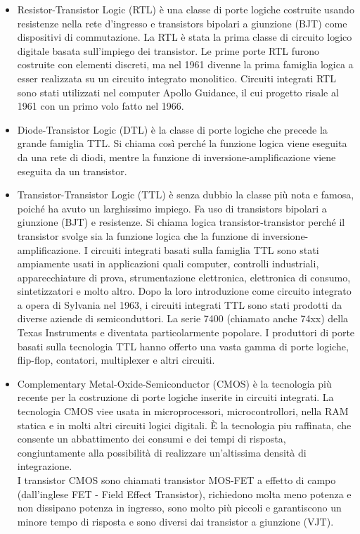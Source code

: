 \documentclass[a4paper]{extarticle}
\begin{document}
\begin{itemize}
    \item Resistor-Transistor Logic (RTL) è una classe di porte logiche costruite usando resistenze nella rete d’ingresso e transistors bipolari a giunzione (BJT) come dispositivi di commutazione. La RTL è stata la prima classe di circuito logico digitale basata sull’impiego dei transistor. Le prime porte RTL furono costruite con elementi discreti, ma nel 1961 divenne la prima famiglia logica a esser realizzata su un circuito integrato monolitico. Circuiti integrati RTL sono stati utilizzati nel computer Apollo Guidance, il cui progetto risale al 1961 con un primo volo fatto nel 1966.

    \item Diode-Transistor Logic (DTL) è la classe di porte logiche che precede la grande famiglia TTL. Si chiama così perché la funzione logica viene eseguita da una rete di diodi, mentre la funzione di inversione-amplificazione viene eseguita da un transistor.

    \item Transistor-Transistor Logic (TTL) è senza dubbio la classe più nota e famosa, poiché ha avuto un larghissimo impiego. Fa uso di transistors bipolari a giunzione (BJT) e resistenze. Si chiama logica transistor-transistor perché il transistor svolge sia la funzione logica che la funzione di inversione-amplificazione. I circuiti integrati basati sulla famiglia TTL sono stati ampiamente usati in applicazioni quali computer, controlli industriali, apparecchiature di prova, strumentazione elettronica, elettronica di consumo, sintetizzatori e molto altro. Dopo la loro introduzione come circuito integrato a opera di Sylvania nel 1963, i circuiti integrati TTL sono stati prodotti da diverse aziende di semiconduttori. La serie 7400 (chiamato anche 74xx) della Texas Instruments e diventata particolarmente popolare. I produttori di porte basati sulla tecnologia TTL hanno offerto una vasta gamma di porte logiche, flip-flop, contatori, multiplexer e altri circuiti.

    \item Complementary Metal-Oxide-Semiconductor (CMOS) è la tecnologia più recente per la costruzione di porte logiche inserite in circuiti integrati. La tecnologia CMOS viee usata in microprocessori, microcontrollori, nella RAM statica e in molti altri circuiti logici digitali. È la tecnologia piu raffinata, che consente un abbattimento dei consumi e dei tempi di risposta, congiuntamente alla possibilità di realizzare un’altissima densità di integrazione.\\
    I transistor CMOS sono chiamati transistor MOS-FET a effetto di campo (dall'inglese FET - Field Effect Transistor), richiedono molta meno potenza e non dissipano potenza in ingresso, sono molto più piccoli e garantiscono un minore tempo di risposta e sono diversi dai transistor a giunzione (VJT).
\end{itemize}
\end{document}
